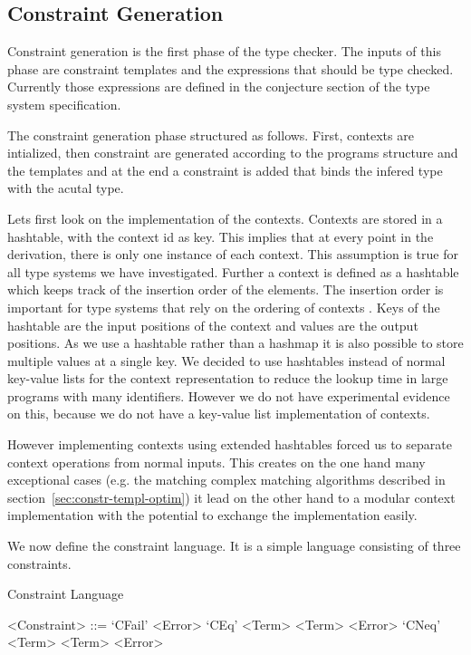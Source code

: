 \subsection{Constraint Generation}
\label{sec:constr-gener}
Constraint generation is the first phase of the type checker. The
inputs of this phase are constraint templates and the expressions that
should be type checked. Currently those expressions are defined in the
conjecture section of the type system specification. 

The constraint generation phase structured as follows. First, contexts
are intialized, then constraint are generated according to the
programs structure and the templates and at the end a constraint is
added that binds the infered type with the acutal type.

Lets first look on the implementation of the contexts. Contexts are
stored in a hashtable, with the context id as key. This implies that
at every point in the derivation, there is only one instance of each
context. This assumption is true for all type systems we have
investigated. Further a context is defined as a hashtable which keeps
track of the insertion order of the elements. The insertion order is
important for type systems that rely on the ordering of contexts
. Keys of the hashtable are the input positions of the
context and values are the output positions. As we use a hashtable
rather than a hashmap it is also possible to store multiple values at
a single key. We decided to use hashtables instead of normal key-value
lists for the context representation to reduce the lookup time in
large programs with many identifiers. However we do not have
experimental evidence on this, because we do not have a key-value list
implementation of contexts.

However implementing contexts using extended hashtables forced us to
separate context operations from normal inputs. This creates on the
one hand many exceptional cases (e.g. the matching complex matching
algorithms described in section~\ref{sec:constr-templ-optim}) it lead
on the other hand to a modular context implementation with the
potential to exchange the implementation easily.

We now define the constraint language. It is a simple language
consisting of three constraints.

\begin{definition}{Constraint Language}
  \begin{grammar}
    <Constraint> ::= `CFail' <Error>
    \alt `CEq' <Term> <Term> <Error>
    \alt `CNeq' <Term> <Term> <Error>
  \end{grammar}
\end{definition}

